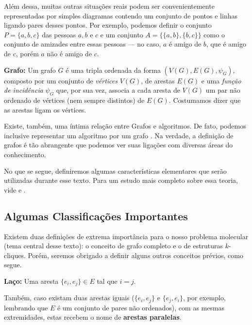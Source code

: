 \documentclass[a4paper,12pt]{article}
\begin{document}
Além dessa, muitas outras situações reais podem ser convenientemente representadas por simples diagramas contendo um conjunto de pontos e linhas ligando pares desses pontos. Por exemplo, podemos definir o conjunto $P = \{a,b,c\}$ das pessoas $a, b$ e $c$ e um conjunto $A = \{\{a,b\}, \{b,c\}\}$ como o conjunto de amizades entre essas pessoas --- no caso, $a$ é amigo de $b$, que é amigo de $c$, porém $a$ não é amigo de $c$. 

\begin{center}
	\begin{minipage}{0.9 \linewidth}
		\textbf{Grafo:} Um grafo $G$ é uma tripla ordenada da forma $(V(G),E(G), \psi_{G})$, composto por um conjunto de \textit{vértices} $V(G)$, de arestas $E(G)$ e uma \textit{função de incidência} $\psi_{G}$ que, por sua vez, associa a cada aresta de $V(G)$ um par não ordenado de vértices (nem sempre distintos) de $E(G)$. Costumamos dizer que as arestas ligam os vértices.
	\end{minipage}
\end{center}

Existe, também, uma íntima relação entre Grafos e algoritmos. De fato, podemos inclusive representar um algoritmo por um grafo \cite{grafos0}. Na verdade, a definição de grafos é tão abrangente que podemos ver suas ligações com diversas áreas do conhecimento. 

No que se segue, definiremos algumas características elementares que serão utilizadas durante esse texto. Para um estudo mais completo sobre essa teoria, vide \cite{grafos1} e \cite{grafosPremioElon}.

\subsection{Algumas Classificações Importantes}

Existem duas definições de extrema importância para o nosso problema molecular (tema central desse texto): o conceito de grafo completo e o de estruturas $k$-cliques. Porém, seremos obrigado a definir alguns outros conceitos prévios, como segue. 


\begin{center}
	\begin{minipage}{0.9 \linewidth}
		\textbf{Laço:} Uma aresta $\{e_i, e_j\} \in E$ tal que $i = j$.
	\end{minipage}
\end{center}

Também, caso existam duas arestas iguais ($\{e_i, e_j\}$ e 
$\{e_j, e_i\}$, por exemplo, lembrando que $E$ é um conjunto de pares não ordenados), com as mesmas extremidades, estas recebem o nome de \textbf{arestas paralelas}.
\end{document}
